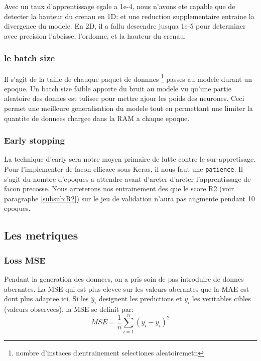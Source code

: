 Avec un taux d'apprentissage egale a 1e-4, nous n'avons ete capable que de detecter la hauteur du crenau en 1D; et une reduction supplementaire entraine la divergence du modele. En 2D, il a fallu descendre jusqua 1e-5 pour determiner avec precision l'abcisse, l'ordonne, et la hauteur du crenau.

\subsubsection{le batch size}
Il s'agit de la taille de chauque paquet de donnnes \footnote{nombre d'instaces d;entrainement selectiones aleatoiremetn} passes au modele durant un epoque. Un batch size faible apporte du bruit au modele vu qu'une partie aleatoire des donnes est tulisee pour mettre ajour les poids des neurones. Ceci permet une meilleure generalisation du modele tout en permettant une limiter la quantite de donnees chargee dans la RAM a chaque epoque.

% 
% 

\subsubsection{Early stopping}
La technique d'early sera notre moyen primaire de lutte contre le sur-appretisage. Pour l'implementer de facon efficace sous Keras, il nous faut une \verb|patience|. Il s'agit du nombre d'epoques a attendre avant d'areter d'areter l'apprentissage de facon precosse. Nous arreterons nos entrainement des que le score R2 (voir paragraphe \ref{subsub:R2}) sur le jeu de validation n'aura pas augmente pendant 10 epoques. 

\subsection{Les metriques}

\subsubsection{Loss MSE}
Pendant la generation des donnees, on a pris soin de pas introduire de donnes aberantes. La MSE qui est plus elevee sur les valeurs aberantes que la MAE est dont plus adaptee ici. Si les $\hat{y}_i$ designent les predictions et $y_i$ les veritables cibles (valeurs observees), la MSE se definit par:
\begin{equation}
 MSE = \frac{1}{n} \sum_{i=1}^{n} \left( y_i - \hat{y}_i \right)^2
 \label{eqn:MSE}
\end{equation}

